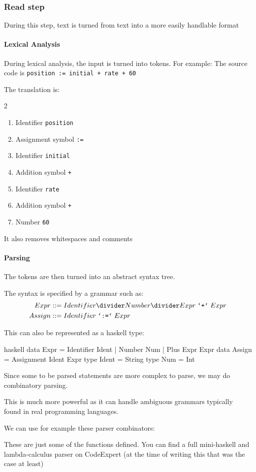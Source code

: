 \subsubsection{Read step}
During this step, text is turned from text into a more easily handlable format


\paragraph{Lexical Analysis}
During lexical analysis, the input is turned into tokens.
For example: The source code is \texttt{position := initial + rate + 60}

The translation is:
\begin{multicols}{2}
    \begin{enumerate}
        \item Identifier \texttt{position}
        \item Assignment symbol \texttt{:=}
        \item Identifier \texttt{initial}
        \item Addition symbol \texttt{+}
        \item Identifier \texttt{rate}
        \item Addition symbol \texttt{+}
        \item Number \texttt{60}
    \end{enumerate}
\end{multicols}

It also removes whitespaces and comments


\paragraph{Parsing}
The tokens are then turned into an abstract syntax tree.

The syntax is specified by a grammar such as:
\begin{align*}
    Expr   & ::= Identifier \divider Number \divider Expr\; \texttt{`+`}\; Expr \\
    Assign & ::= Identifier\; \texttt{`:=`}\; Expr
\end{align*}

This can also be represented as a haskell type:
\begin{code}{haskell}
    data Expr = Identifier Ident | Number Num | Plus Expr Expr
    data Assign = Assignment Ident Expr
    type Ident = String
    type Num = Int
\end{code}

Since some to be parsed statements are more complex to parse, we may do combinatory parsing.

This is much more powerful as it can handle ambiguous grammars typically found in real programming languages.

We can use for example these parser combinators:

\newpage
{}

These are just some of the functions defined.
You can find a full mini-haskell and lambda-calculus parser on CodeExpert (at the time of writing this that was the case at least)
